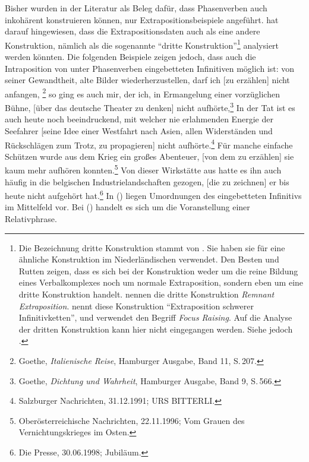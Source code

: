 \noindent
Bisher wurden in der Literatur als Beleg dafür, dass Phasenverben auch inkohärent konstruieren können,
nur Extrapositionsbeispiele angeführt. \citet{Reis2005a} hat darauf hingewiesen, dass
die Extrapositionsdaten auch als eine andere Konstruktion, nämlich als die sogenannte
"`dritte Konstruktion"'\footnote{
	Die Bezeichnung dritte Konstruktion stammt von \citet*{dBR89}.%
	Sie haben sie für eine ähnliche Konstruktion im 
	Niederländischen verwendet. 
	Den Besten und Rutten zeigen, dass es sich bei der Konstruktion weder 
	um die reine Bildung eines Verbalkomplexes noch um normale Extraposition,
	sondern eben um eine dritte Konstruktion handelt. \citet*{BBHR95}
        nennen die dritte Konstruktion \emph{Remnant Extraposition}.
%
        \citet*[]{Wunderlich80} nennt diese Konstruktion "`Extraposition schwerer Infinitivketten"', und
	\citet*[]{Uszkoreit87a} verwendet den Begriff \emph{Focus Raising}.
        Auf die Analyse der dritten Konstruktion kann hier nicht eingegangen werden.
        Siehe jedoch .%
} analysiert werden könnten. Die folgenden Beispiele zeigen jedoch,
dass auch die Intraposition von unter Phasenverben eingebetteten Infinitiven möglich ist:
\eal
\ex von seiner Gewandtheit, alte Bilder wiederherzustellen,  darf ich [zu erzählen] nicht anfangen,%
\footnote{
 Goethe, \emph{Italienische Reise}, Hamburger Ausgabe, Band 11, S.\,207.
}
\ex so ging es auch mir, der ich, in Ermangelung einer vorzüglichen Bühne, [über das deutsche Theater zu denken] nicht aufhörte,\footnote{
  Goethe, \emph{Dichtung und Wahrheit}, Hamburger Ausgabe, Band 9, S.\,566.
}
\ex\label{bsp-seefahrer} 
In der Tat ist es auch heute noch beeindruckend, 
    mit welcher nie erlahmenden Energie der Seefahrer 
    [seine Idee einer Westfahrt nach Asien, allen Widerständen und Rückschlägen zum Trotz, 
    zu propagieren] nicht aufhörte.\footnote{
      Salzburger Nachrichten, 31.12.1991; URS BITTERLI.%
    }
\zl
\eal
\ex Für manche einfache Schützen wurde aus dem Krieg ein großes Abenteuer, [von dem zu erzählen] 
    sie kaum mehr aufhören konnten.\footnote{
  Oberösterreichische Nachrichten, 22.11.1996; Vom Grauen des Vernichtungskrieges im Osten.%
}
\ex Von dieser Wirkstätte aus hatte es ihn auch häufig in die belgischen Industrielandschaften gezogen, [die zu zeichnen] er bis heute nicht aufgehört hat.\footnote{
  Die Presse, 30.06.1998; Jubiläum.%
}
\zl
In () liegen Umordnungen des eingebetteten Infinitivs im Mittelfeld vor. Bei () handelt
es sich um die Voranstellung einer Relativphrase.

